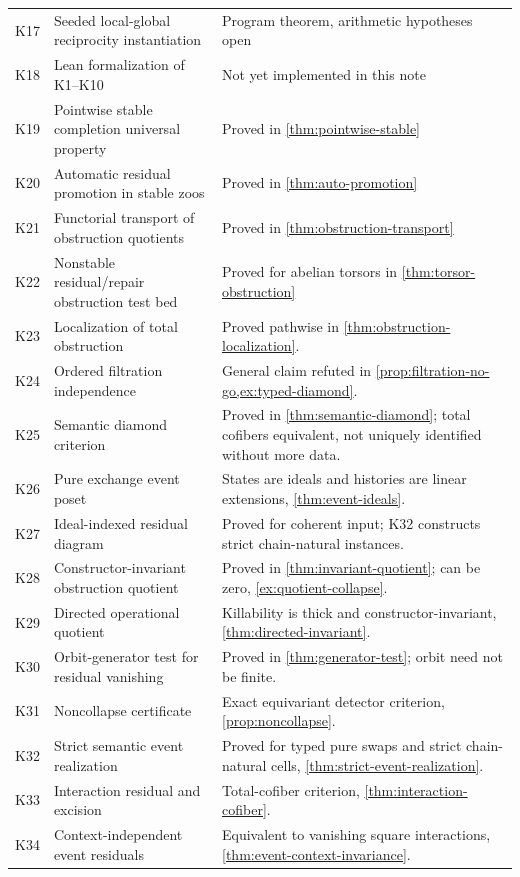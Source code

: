 \documentclass[11pt]{article}
\theoremstyle{definition}
\theoremstyle{remark}
\begin{document}
\begin{longtable}{>{\raggedright\arraybackslash}p{} >{\raggedright\arraybackslash}p{} >{\raggedright\arraybackslash}p{}}
K17 & Seeded local-global reciprocity instantiation & Program theorem, arithmetic hypotheses open\\
K18 & Lean formalization of K1--K10 & Not yet implemented in this note\\
K19 & Pointwise stable completion universal property & Proved in \cref{thm:pointwise-stable}\\
K20 & Automatic residual promotion in stable zoos & Proved in \cref{thm:auto-promotion}\\
K21 & Functorial transport of obstruction quotients & Proved in \cref{thm:obstruction-transport}\\
K22 & Nonstable residual/repair obstruction test bed & Proved for abelian torsors in \cref{thm:torsor-obstruction}\\
K23 & Localization of total obstruction & Proved pathwise in \cref{thm:obstruction-localization}.\\
K24 & Ordered filtration independence & General claim refuted in \cref{prop:filtration-no-go,ex:typed-diamond}.\\
K25 & Semantic diamond criterion & Proved in \cref{thm:semantic-diamond}; total cofibers equivalent, not uniquely identified without more data.\\
K26 & Pure exchange event poset & States are ideals and histories are linear extensions, \cref{thm:event-ideals}.\\
K27 & Ideal-indexed residual diagram & Proved for coherent input; K32 constructs strict chain-natural instances.\\
K28 & Constructor-invariant obstruction quotient & Proved in \cref{thm:invariant-quotient}; can be zero, \cref{ex:quotient-collapse}.\\
K29 & Directed operational quotient & Killability is thick and constructor-invariant, \cref{thm:directed-invariant}.\\
K30 & Orbit-generator test for residual vanishing & Proved in \cref{thm:generator-test}; orbit need not be finite.\\
K31 & Noncollapse certificate & Exact equivariant detector criterion, \cref{prop:noncollapse}.\\
K32 & Strict semantic event realization & Proved for typed pure swaps and strict chain-natural cells, \cref{thm:strict-event-realization}.\\
K33 & Interaction residual and excision & Total-cofiber criterion, \cref{thm:interaction-cofiber}.\\
K34 & Context-independent event residuals & Equivalent to vanishing square interactions, \cref{thm:event-context-invariance}.\\

\end{longtable}
\end{document}

